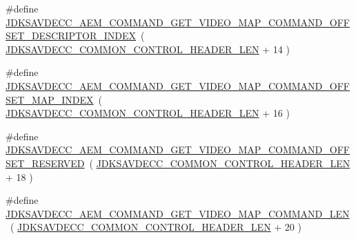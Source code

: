 \begin{DoxyCompactItemize}
\#define \hyperlink{group__command__get__video__map_gaac224bf2027493db0198a00b44c85869}{J\+D\+K\+S\+A\+V\+D\+E\+C\+C\+\_\+\+A\+E\+M\+\_\+\+C\+O\+M\+M\+A\+N\+D\+\_\+\+G\+E\+T\+\_\+\+V\+I\+D\+E\+O\+\_\+\+M\+A\+P\+\_\+\+C\+O\+M\+M\+A\+N\+D\+\_\+\+O\+F\+F\+S\+E\+T\+\_\+\+D\+E\+S\+C\+R\+I\+P\+T\+O\+R\+\_\+\+I\+N\+D\+EX}~( \hyperlink{group__jdksavdecc__avtp__common__control__header_gaae84052886fb1bb42f3bc5f85b741dff}{J\+D\+K\+S\+A\+V\+D\+E\+C\+C\+\_\+\+C\+O\+M\+M\+O\+N\+\_\+\+C\+O\+N\+T\+R\+O\+L\+\_\+\+H\+E\+A\+D\+E\+R\+\_\+\+L\+EN} + 14 )
\item 
\#define \hyperlink{group__command__get__video__map_gac9d141bc6837b1748c86f5ad17da262f}{J\+D\+K\+S\+A\+V\+D\+E\+C\+C\+\_\+\+A\+E\+M\+\_\+\+C\+O\+M\+M\+A\+N\+D\+\_\+\+G\+E\+T\+\_\+\+V\+I\+D\+E\+O\+\_\+\+M\+A\+P\+\_\+\+C\+O\+M\+M\+A\+N\+D\+\_\+\+O\+F\+F\+S\+E\+T\+\_\+\+M\+A\+P\+\_\+\+I\+N\+D\+EX}~( \hyperlink{group__jdksavdecc__avtp__common__control__header_gaae84052886fb1bb42f3bc5f85b741dff}{J\+D\+K\+S\+A\+V\+D\+E\+C\+C\+\_\+\+C\+O\+M\+M\+O\+N\+\_\+\+C\+O\+N\+T\+R\+O\+L\+\_\+\+H\+E\+A\+D\+E\+R\+\_\+\+L\+EN} + 16 )
\item 
\#define \hyperlink{group__command__get__video__map_gad431759fec014e0505fd533f81f8437c}{J\+D\+K\+S\+A\+V\+D\+E\+C\+C\+\_\+\+A\+E\+M\+\_\+\+C\+O\+M\+M\+A\+N\+D\+\_\+\+G\+E\+T\+\_\+\+V\+I\+D\+E\+O\+\_\+\+M\+A\+P\+\_\+\+C\+O\+M\+M\+A\+N\+D\+\_\+\+O\+F\+F\+S\+E\+T\+\_\+\+R\+E\+S\+E\+R\+V\+ED}~( \hyperlink{group__jdksavdecc__avtp__common__control__header_gaae84052886fb1bb42f3bc5f85b741dff}{J\+D\+K\+S\+A\+V\+D\+E\+C\+C\+\_\+\+C\+O\+M\+M\+O\+N\+\_\+\+C\+O\+N\+T\+R\+O\+L\+\_\+\+H\+E\+A\+D\+E\+R\+\_\+\+L\+EN} + 18 )
\item 
\#define \hyperlink{group__command__get__video__map_ga78bd72a08509c2760fcd1ce6eae3f093}{J\+D\+K\+S\+A\+V\+D\+E\+C\+C\+\_\+\+A\+E\+M\+\_\+\+C\+O\+M\+M\+A\+N\+D\+\_\+\+G\+E\+T\+\_\+\+V\+I\+D\+E\+O\+\_\+\+M\+A\+P\+\_\+\+C\+O\+M\+M\+A\+N\+D\+\_\+\+L\+EN}~( \hyperlink{group__jdksavdecc__avtp__common__control__header_gaae84052886fb1bb42f3bc5f85b741dff}{J\+D\+K\+S\+A\+V\+D\+E\+C\+C\+\_\+\+C\+O\+M\+M\+O\+N\+\_\+\+C\+O\+N\+T\+R\+O\+L\+\_\+\+H\+E\+A\+D\+E\+R\+\_\+\+L\+EN} + 20 )
\end{DoxyCompactItemize}
